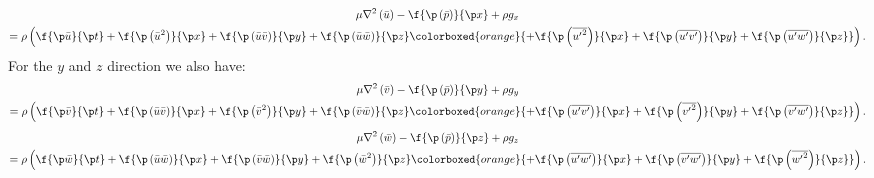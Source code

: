 \begin{multline}
  \mu \nabla^2 \left(\bar{u}\right) - \f{\p \left(\bar{p}\right)}{\p x} + \rho g_x \\
  =
  \rho \left(
    \f{\p \bar{u}}{\p t}
    + \f{\p \left({\bar{u}}^2\right)}{\p x}
    + \f{\p \left(\bar{u}\bar{v}\right)}{\p y}
    + \f{\p \left(\bar{u}\bar{w}\right)}{\p z}
    \colorboxed{orange}{
    + \f{\p \left(\overline{{{u^\prime}}^2}\right)}{\p x}
    + \f{\p \left(\overline{{u^\prime}{v^\prime}}\right)}{\p y}
    + \f{\p \left(\overline{{u^\prime}{w^\prime}}\right)}{\p z}
    }
  \right).
  \label{eq:NS-time-averaged-x}
\end{multline}
%
For the \(y\) and \(z\) direction we also have:
%
\begin{multline}
  \mu \nabla^2 \left(\bar{v}\right) - \f{\p \left(\bar{p}\right)}{\p y} + \rho g_y \\
  =
  \rho \left(
    \f{\p \bar{v}}{\p t}
    + \f{\p \left(\bar{u}\bar{v}\right)}{\p x}
    + \f{\p \left({\bar{v}}^2\right)}{\p y}
    + \f{\p \left(\bar{v}\bar{w}\right)}{\p z}
    \colorboxed{orange}{
      + \f{\p \left(\overline{{u^\prime}{v^\prime}}\right)}{\p x}
      + \f{\p \left(\overline{{{v^\prime}}^2}\right)}{\p y}
      + \f{\p \left(\overline{{v^\prime}{w^\prime}}\right)}{\p z}
    }
  \right).
  \label{eq:NS-time-averaged-y}
\end{multline}
%
\begin{multline}
  \mu \nabla^2 \left(\bar{w}\right) - \f{\p \left(\bar{p}\right)}{\p z} + \rho g_z \\
  =
  \rho \left(
    \f{\p \bar{w}}{\p t}
    + \f{\p \left(\bar{u}\bar{w}\right)}{\p x}
    + \f{\p \left(\bar{v}\bar{w}\right)}{\p y}
    + \f{\p \left({\bar{w}}^2\right)}{\p z}
    \colorboxed{orange}{
      + \f{\p \left(\overline{{u^\prime}{w^\prime}}\right)}{\p x}
      + \f{\p \left(\overline{{v^\prime}{w^\prime}}\right)}{\p y}
      + \f{\p \left(\overline{{{w^\prime}}^2}\right)}{\p z}
    }
  \right).
  \label{eq:NS-time-averaged-z}
\end{multline}


